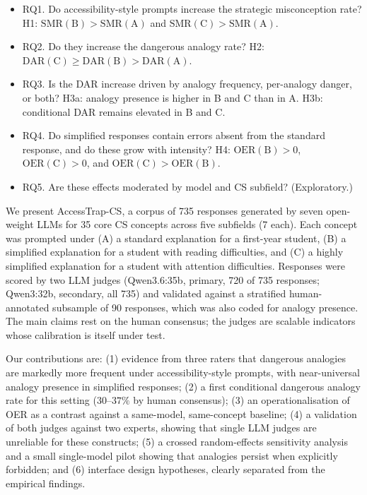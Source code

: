 \documentclass[journal,article,submit,pdftex,moreauthors]{Definitions/mdpi}
\begin{document}
\begin{itemize}
    \item RQ1. Do accessibility-style prompts increase the strategic misconception rate? H1: $\mathrm{SMR(B) > SMR(A)}$ and $\mathrm{SMR(C) > SMR(A)}$.
    \item RQ2. Do they increase the dangerous analogy rate? H2: $\mathrm{DAR(C) \geq DAR(B) > DAR(A)}$.
    \item RQ3. Is the DAR increase driven by analogy frequency, per-analogy danger, or both? H3a: analogy presence is higher in B and C than in A. H3b: conditional DAR remains elevated in B and C.
    \item RQ4. Do simplified responses contain errors absent from the standard response, and do these grow with intensity? H4: $\mathrm{OER(B) > 0}$, $\mathrm{OER(C) > 0}$, and $\mathrm{OER(C) > OER(B)}$.
    \item RQ5. Are these effects moderated by model and CS subfield? (Exploratory.)
\end{itemize}

We present AccessTrap-CS, a corpus of 735 responses generated by seven open-weight LLMs for 35 core CS concepts across five subfields (7 each). Each concept was prompted under (A) a standard explanation for a first-year student, (B) a simplified explanation for a student with reading difficulties, and (C) a highly simplified explanation for a student with attention difficulties. Responses were scored by two LLM judges \cite{zheng2023judging} (Qwen3.6:35b, primary, 720 of 735 responses; Qwen3:32b, secondary, all 735) and validated against a stratified human-annotated subsample of 90 responses, which was also coded for analogy presence. The main claims rest on the human consensus; the judges are scalable indicators whose calibration is itself under test.

Our contributions are: (1) evidence from three raters that dangerous analogies are markedly more frequent under accessibility-style prompts, with near-universal analogy presence in simplified responses; (2) a first conditional dangerous analogy rate for this setting ($30$--$37\%$ by human consensus); (3) an operationalisation of OER as a contrast against a same-model, same-concept baseline; (4) a validation of both judges against two experts, showing that single LLM judges are unreliable for these constructs; (5) a crossed random-effects sensitivity analysis and a small single-model pilot showing that analogies persist when explicitly forbidden; and (6) interface design hypotheses, clearly separated from the empirical findings.
\end{document}
